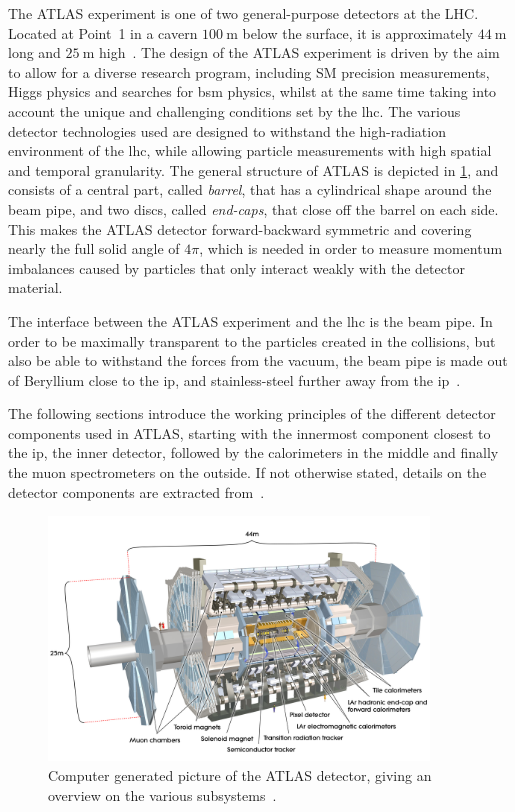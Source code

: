 The ATLAS experiment is one of two general-purpose detectors at the LHC. Located at Point~1 in a cavern $\SI{100}{\meter}$ below the surface, it is approximately $\SI{44}{\meter}$ long and $\SI{25}{\meter}$ high~\cite{Aad:2008zzm}. The design of the ATLAS experiment is driven by the aim to allow for a diverse research program, including SM precision measurements, Higgs physics and searches for \gls{bsm} physics, whilst at the same time taking into account the unique and challenging conditions set by the \gls{lhc}. The various detector technologies used are designed to withstand the high-radiation environment of the \gls{lhc}, while allowing particle measurements with high spatial and temporal granularity. The general structure of ATLAS is depicted in \cref{fig:atlas_detector}, and consists of a central part, called \textit{barrel}, that has a cylindrical shape around the beam pipe, and two discs, called \textit{end-caps}, that close off the barrel on each side. This makes the ATLAS detector forward-backward symmetric and covering nearly the full solid angle of $4\pi$, which is needed in order to measure momentum imbalances caused by particles that only interact weakly with the detector material.

The interface between the ATLAS experiment and the \gls{lhc} is the beam pipe. In order to be maximally transparent to the particles created in the collisions, but also be able to withstand the forces from the vacuum, the beam pipe is made out of Beryllium close to the \gls{ip}, and stainless-steel further away from the \gls{ip}~\cite{Brock:1354959}.

The following sections introduce the working principles of the different detector components used in ATLAS, starting with the innermost component closest to the \gls{ip}, the inner detector, followed by the calorimeters in the middle and finally the muon spectrometers on the outside. If not otherwise stated, details on the detector components are extracted from~\cite{Aad:2008zzm}.

\begin{figure}
	\centering    
	\includegraphics[width=0.9\textwidth]{atlas}
	\caption[The ATLAS detector]{Computer generated picture of the ATLAS detector, giving an overview on the various subsystems~\cite{Pequenao:1095924}.}
	\label{fig:atlas_detector}
\end{figure}


